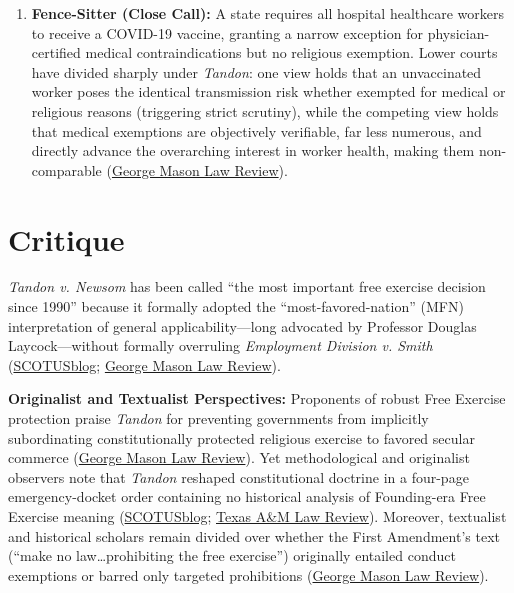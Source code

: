 \documentclass[12pt]{article}
\begin{document}
\begin{enumerate}
\item \textbf{Fence-Sitter (Close Call):} A state requires all hospital healthcare workers to receive a COVID-19 vaccine, granting a narrow exception for physician-certified medical contraindications but no religious exemption. Lower courts have divided sharply under \textit{Tandon}: one view holds that an unvaccinated worker poses the identical transmission risk whether exempted for medical or religious reasons (triggering strict scrutiny), while the competing view holds that medical exemptions are objectively verifiable, far less numerous, and directly advance the overarching interest in worker health, making them non-comparable (\href{https://lawreview.gmu.edu/print__issues/religious-and-secular-comparators/}{George Mason Law Review}).
\end{enumerate}

\section{Critique}
\textit{Tandon v. Newsom} has been called ``the most important free exercise decision since 1990'' because it formally adopted the ``most-favored-nation'' (MFN) interpretation of general applicability---long advocated by Professor Douglas Laycock---without formally overruling \textit{Employment Division v. Smith} (\href{https://www.scotusblog.com/2021/04/tandon-steals-fultons-thunder-the-most-important-free-exercise-decision-since-1990/}{SCOTUSblog}; \href{https://lawreview.gmu.edu/print__issues/religious-and-secular-comparators/}{George Mason Law Review}).

\textbf{Originalist and Textualist Perspectives:} Proponents of robust Free Exercise protection praise \textit{Tandon} for preventing governments from implicitly subordinating constitutionally protected religious exercise to favored secular commerce (\href{https://lawreview.gmu.edu/print__issues/religious-and-secular-comparators/}{George Mason Law Review}). Yet methodological and originalist observers note that \textit{Tandon} reshaped constitutional doctrine in a four-page emergency-docket order containing no historical analysis of Founding-era Free Exercise meaning (\href{https://www.scotusblog.com/2021/04/tandon-steals-fultons-thunder-the-most-important-free-exercise-decision-since-1990/}{SCOTUSblog}; \href{https://scholarship.law.tamu.edu/cgi/viewcontent.cgi?article=1410&context=lawreview}{Texas A\&M Law Review}). Moreover, textualist and historical scholars remain divided over whether the First Amendment's text (``make no law\ldots prohibiting the free exercise'') originally entailed conduct exemptions or barred only targeted prohibitions (\href{https://lawreview.gmu.edu/print__issues/religious-and-secular-comparators/}{George Mason Law Review}).
\end{document}
